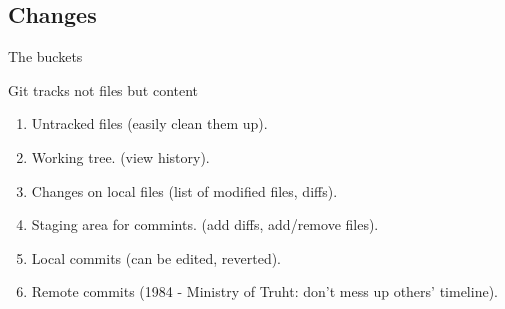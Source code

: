 \documentclass{beamer}
\begin{document}

\subsection{Changes}

\begin{frame}{The buckets}

\begin{block}{Git tracks not files but content}
\begin{enumerate}
 \item Untracked files (easily clean them up).
 \item Working tree. (view history).
 \item Changes on local files (list of modified files, diffs).
 \item Staging area for commints. (add diffs, add/remove files).
 \item Local commits (can be edited, reverted).
 \item Remote commits (1984 - Ministry of Truht: don't mess up others' timeline).
\end{enumerate}
\end{block}
 
\end{frame}

\end{document}
